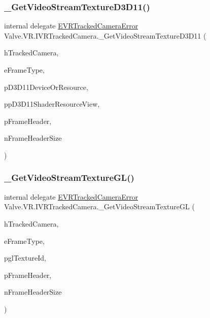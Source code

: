 \subsubsection{\texorpdfstring{\_GetVideoStreamTextureD3D11()}{\_GetVideoStreamTextureD3D11()}}
{\footnotesize\ttfamily internal delegate \mbox{\hyperlink{namespace_valve_1_1_v_r_ad0e012e846f5d93848783c044614cfd3}{E\+V\+R\+Tracked\+Camera\+Error}} Valve.\+V\+R.\+I\+V\+R\+Tracked\+Camera.\+\_\+\+Get\+Video\+Stream\+Texture\+D3\+D11 (\begin{DoxyParamCaption}\item[{ulong}]{h\+Tracked\+Camera,  }\item[{\mbox{\hyperlink{namespace_valve_1_1_v_r_a9962211bc3fe98c2683db188c12c9afd}{E\+V\+R\+Tracked\+Camera\+Frame\+Type}}}]{e\+Frame\+Type,  }\item[{Int\+Ptr}]{p\+D3\+D11\+Device\+Or\+Resource,  }\item[{ref Int\+Ptr}]{pp\+D3\+D11\+Shader\+Resource\+View,  }\item[{ref \mbox{\hyperlink{struct_valve_1_1_v_r_1_1_camera_video_stream_frame_header__t}{Camera\+Video\+Stream\+Frame\+Header\+\_\+t}}}]{p\+Frame\+Header,  }\item[{uint}]{n\+Frame\+Header\+Size }\end{DoxyParamCaption})}

\mbox{\label{struct_valve_1_1_v_r_1_1_i_v_r_tracked_camera_afb798bb54c37360e64429e07763b6cff}} 
\subsubsection{\texorpdfstring{\_GetVideoStreamTextureGL()}{\_GetVideoStreamTextureGL()}}
{\footnotesize\ttfamily internal delegate \mbox{\hyperlink{namespace_valve_1_1_v_r_ad0e012e846f5d93848783c044614cfd3}{E\+V\+R\+Tracked\+Camera\+Error}} Valve.\+V\+R.\+I\+V\+R\+Tracked\+Camera.\+\_\+\+Get\+Video\+Stream\+Texture\+GL (\begin{DoxyParamCaption}\item[{ulong}]{h\+Tracked\+Camera,  }\item[{\mbox{\hyperlink{namespace_valve_1_1_v_r_a9962211bc3fe98c2683db188c12c9afd}{E\+V\+R\+Tracked\+Camera\+Frame\+Type}}}]{e\+Frame\+Type,  }\item[{ref uint}]{pgl\+Texture\+Id,  }\item[{ref \mbox{\hyperlink{struct_valve_1_1_v_r_1_1_camera_video_stream_frame_header__t}{Camera\+Video\+Stream\+Frame\+Header\+\_\+t}}}]{p\+Frame\+Header,  }\item[{uint}]{n\+Frame\+Header\+Size }\end{DoxyParamCaption})}

